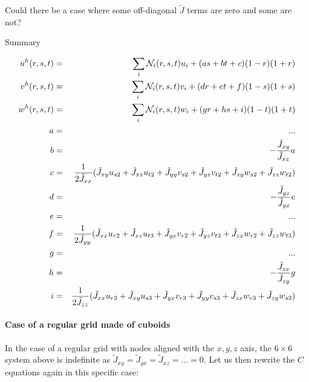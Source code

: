 Could there be a case where some off-diagonal $\tilde{J}$ terms
are zero and some are not?


Summary
\begin{mdframed}[backgroundcolor=blue!5]
\begin{eqnarray}
u^h(r,s,t)&=&\sum_i {\mathcal{N}}_i(r,s,t) u_i + (a s + b t +c)(1-r)(1+r) \nonumber\\
v^h(r,s,t)&=&\sum_i {\mathcal{N}}_i(r,s,t) v_i + (d r + e t +f)(1-s)(1+s) \nonumber\\
w^h(r,s,t)&=&\sum_i {\mathcal{N}}_i(r,s,t) w_i + (g r + h s +i)(1-t)(1+t) \nonumber\\
a&=& ... \\
b&=&-\frac{\tilde{J}_{xy}}{\tilde{J}_{xz}} a \nonumber\\ 
c&=& \frac{1}{2 \tilde{J}_{xx}} (
\tilde{J}_{xy} u_{s2} + \tilde{J}_{xz} u_{t2} + 
\tilde{J}_{yy} v_{s2} + \tilde{J}_{yz} v_{t2} + 
\tilde{J}_{zy} w_{s2} + \tilde{J}_{zz} w_{t2} ) \nonumber\\
d&=&-\frac{\tilde{J}_{yz}}{\tilde{J}_{yx}} e \nonumber\\
e&=& ... \\
f&=& \frac{1}{2 \tilde{J}_{yy}} (  
\tilde{J}_{xx} u_{r2} + \tilde{J}_{xz} u_{t3} +
\tilde{J}_{yx} v_{r2} + \tilde{J}_{yz} v_{t3} +
\tilde{J}_{zx} w_{r2} + \tilde{J}_{zz} w_{t3} ) \nonumber\\
g&=& ... \\
h&=&-\frac{\tilde{J}_{zx}}{\tilde{J}_{zy}} g \nonumber\\
i&=& \frac{1}{2 \tilde{J}_{zz}} (  
\tilde{J}_{xx} u_{r3} + \tilde{J}_{xy} u_{s3} +
\tilde{J}_{yx} v_{r3} + \tilde{J}_{yy} v_{s3} +
\tilde{J}_{zx} w_{r3} + \tilde{J}_{zy} w_{s3} ) \nonumber
\end{eqnarray}
\end{mdframed}

\paragraph{Case of a regular grid made of cuboids}

In the case of a regular grid with nodes aligned with the $x,y,z$ axis, the $6\times 6$ 
system above is indefinite as $\tilde{J}_{xy}=\tilde{J}_{yx}=\tilde{J}_{xz}=...=0$.
Let us then rewrite the $C$ equations again in this specific case:

